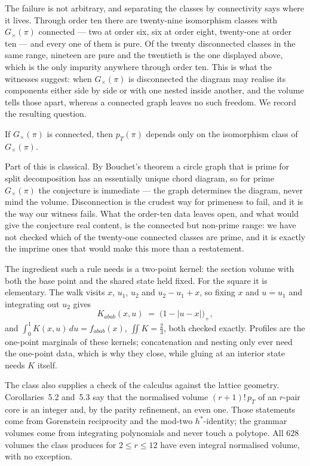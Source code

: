 The failure is not arbitrary, and separating the classes by connectivity
says where it lives.  Through order ten there are twenty-nine
isomorphism classes with $G_\times(\pi)$ connected --- two at order six,
six at order eight, twenty-one at order ten --- and every one of them is
pure.  Of the twenty disconnected classes in the same range, nineteen
are pure and the twentieth is the one displayed above, which is the only
impurity anywhere through order ten.  This is what the witnesses
suggest: when $G_\times(\pi)$ is
disconnected the diagram may realise its components either side by side
or with one nested inside another, and the volume tells those apart,
whereas a connected graph leaves no such freedom.  We record the
resulting question.

\begin{conjecture}
If $G_\times(\pi)$ is connected, then $p_T(\pi)$ depends only on the
isomorphism class of $G_\times(\pi)$.
\end{conjecture}

\begin{remark}
Part of this is classical.  By Bouchet's theorem a circle graph that is
prime for split decomposition has an essentially unique chord diagram,
so for prime $G_\times(\pi)$ the conjecture is immediate --- the graph
determines the diagram, never mind the volume.  Disconnection is the
crudest way for primeness to fail, and it is the way our witness fails.
What the order-ten data leaves open, and what would give the conjecture
real content, is the connected but non-prime range: we have not checked
which of the twenty-one connected classes are prime, and it is exactly
the imprime ones that would make this more than a restatement.
\end{remark}

The ingredient such a rule needs is a two-point kernel: the section
volume with both the base point and the shared state held fixed.  For
the square it is elementary.  The walk visits $x$, $u_1$, $u_2$ and
$u_2-u_1+x$, so fixing $x$ and $u=u_1$ and integrating out $u_2$ gives
\[
K_{abab}(x,u)\;=\;\bigl(1-|u-x|\bigr)_+ ,
\]
and $\int_0^1K(x,u)\,du=f_{abab}(x)$, $\iint K=\tfrac23$, both checked
exactly.  Profiles are the one-point marginals of these kernels;
concatenation and nesting only ever need the one-point data, which is
why they close, while gluing at an interior state needs $K$ itself.

The class also supplies a check of the calculus against the lattice
geometry.  Corollaries~5.2 and~5.3 say that the normalised volume
$(r+1)!\,p_T$ of an $r$-pair core is an integer and, by the parity
refinement, an even one.  Those statements come from Gorenstein
reciprocity and the mod-two $h^*$-identity; the grammar volumes come
from integrating polynomials and never touch a polytope.  All $628$
volumes the class produces for $2\le r\le12$ have even integral
normalised volume, with no exception.


